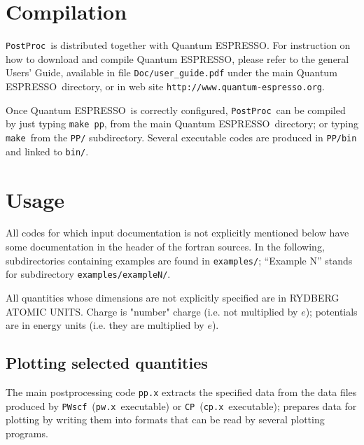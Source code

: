 \documentclass[12pt,a4paper]{article}
\def\qe{{\sc Quantum ESPRESSO}}
\def\pwx{\texttt{pw.x}}
\def\cpx{\texttt{cp.x}}
\def\PWscf{\texttt{PWscf}}
\def\CP{\texttt{CP}}
\def\PostProc{\texttt{PostProc}}
\def\make{\texttt{make}}
\begin{document}
\section{Compilation}

\PostProc\ is distributed together with \qe.
For instruction on how to download and compile \qe, please refer 
to the general Users' Guide, available in file \texttt{Doc/user\_guide.pdf}
under the main \qe\ directory, or in web site 
\texttt{http://www.quantum-espresso.org}.

Once \qe\ is correctly configured, \PostProc\ can be compiled by
just typing \texttt{make pp}, from the main \qe\ directory;
or typing \make\ from the \texttt{PP/} subdirectory.
Several executable codes are produced in \texttt{PP/bin}
and linked to \texttt{bin/}.

\section{Usage}

All codes for which input documentation is not explicitly mentioned below
have some documentation in the header of the fortran sources.
In the following, subdirectories containing examples are found in
\texttt{examples/}; ``Example N'' stands for subdirectory 
\texttt{examples/exampleN/}.

All quantities whose dimensions are not explicitly specified are in
RYDBERG ATOMIC UNITS. Charge is "number" charge (i.e. not multiplied 
by $e$); potentials are in energy units (i.e. they are multiplied by 
$e$).

\subsection{Plotting selected quantities}
  
The main postprocessing code \texttt{pp.x} extracts the specified data
from the data files produced by \PWscf\ (\pwx\ executable) or \CP\ 
(\cpx\ executable); prepares data for plotting by writing them into 
formats that can be read by several plotting programs.
\end{document}
